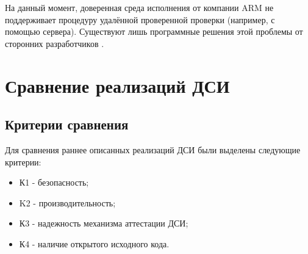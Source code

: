На данный момент, доверенная среда исполнения от компании ARM не поддерживает процедуру удалённой проверенной проверки (например, с помощью сервера). Существуют лишь программные решения этой проблемы от сторонних разработчиков \cite{comparsion-arm-intel}.

\section{Сравнение реализаций ДСИ}

\subsection{Критерии сравнения}

Для сравнения раннее описанных реализаций ДСИ были выделены следующие критерии:

\begin{itemize}
	\item К1 - безопасность;
	\item K2 - производительность;
	\item К3 - надежность механизма аттестации ДСИ;
	\item К4 - наличие открытого исходного кода.
\end{itemize}

\pagebreak
